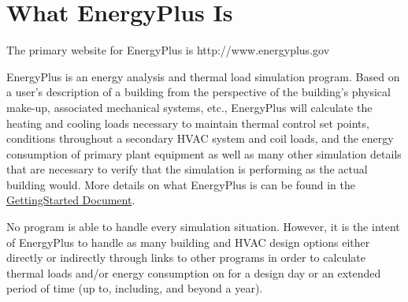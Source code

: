 \section{What EnergyPlus Is}\label{what-energyplus-is}

The primary website for EnergyPlus is http://www.energyplus.gov

EnergyPlus is an energy analysis and thermal load simulation program. Based on a user's description of a building from the perspective of the building's physical make-up, associated mechanical systems, etc., EnergyPlus will calculate the heating and cooling loads necessary to maintain thermal control set points, conditions throughout a secondary HVAC system and coil loads, and the energy consumption of primary plant equipment as well as many other simulation details that are necessary to verify that the simulation is performing as the actual building would. More details on what EnergyPlus is can be found in the \href{file:///E:/Docs4PDFs/GettingStarted.pdf}{GettingStarted Document}.

No program is able to handle every simulation situation. However, it is the intent of EnergyPlus to handle as many building and HVAC design options either directly or indirectly through links to other programs in order to calculate thermal loads and/or energy consumption on for a design day or an extended period of time (up to, including, and beyond a year).
